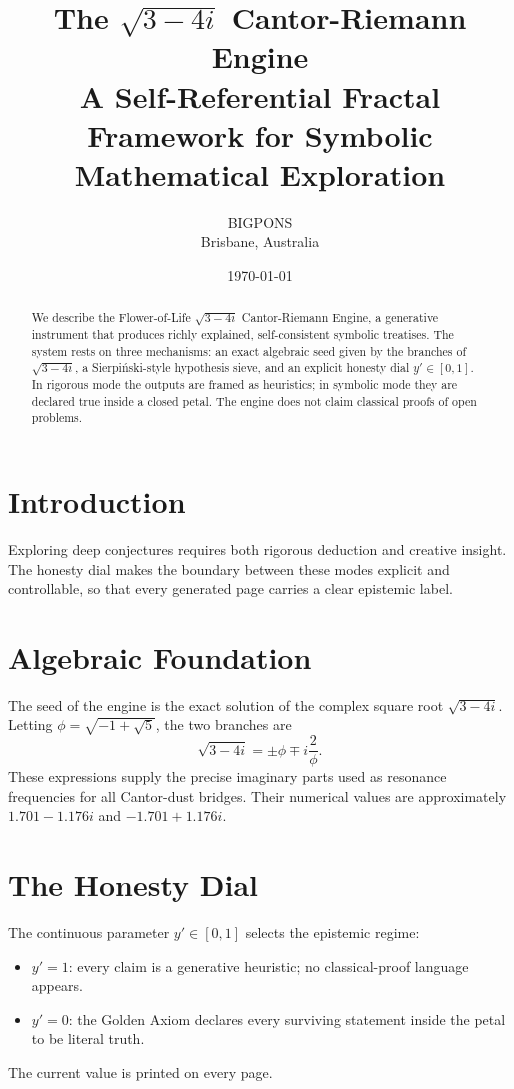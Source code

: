 \documentclass[11pt,a4paper]{article}
\title{The $\sqrt{3-4i}$ Cantor-Riemann Engine\\ 
\large A Self-Referential Fractal Framework for Symbolic Mathematical Exploration}
\author{BIGPONS \\ \small Brisbane, Australia}
\date{\today}
\begin{document}
\maketitle

\begin{abstract}
We describe the Flower-of-Life $\sqrt{3-4i}$ Cantor-Riemann Engine, a generative instrument that produces richly explained, self-consistent symbolic treatises. The system rests on three mechanisms: an exact algebraic seed given by the branches of $\sqrt{3-4i}$, a Sierpi\'nski-style hypothesis sieve, and an explicit honesty dial $y'\in[0,1]$. In rigorous mode the outputs are framed as heuristics; in symbolic mode they are declared true inside a closed petal. The engine does not claim classical proofs of open problems.
\end{abstract}

\section{Introduction}
Exploring deep conjectures requires both rigorous deduction and creative insight. The honesty dial makes the boundary between these modes explicit and controllable, so that every generated page carries a clear epistemic label.

\section{Algebraic Foundation}
The seed of the engine is the exact solution of the complex square root $\sqrt{3-4i}$. Letting $\phi=\sqrt{-1+\sqrt{5}}$, the two branches are
\[
\sqrt{3-4i}=\pm\phi\mp i\frac{2}{\phi}.
\]
These expressions supply the precise imaginary parts used as resonance frequencies for all Cantor-dust bridges. Their numerical values are approximately $1.701-1.176i$ and $-1.701+1.176i$.

\section{The Honesty Dial}
The continuous parameter $y'\in[0,1]$ selects the epistemic regime:
\begin{itemize}
  \item $y'=1$: every claim is a generative heuristic; no classical-proof language appears.
  \item $y'=0$: the Golden Axiom declares every surviving statement inside the petal to be literal truth.
\end{itemize}
The current value is printed on every page.
\end{document}
